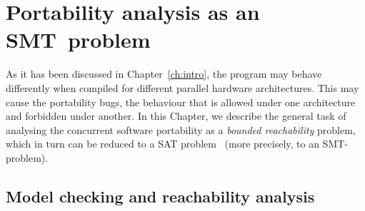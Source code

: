 \chapter{Portability analysis as an SMT~problem}%
\label{ch:port}







As it has been discussed in Chapter~\ref{ch:intro}, the program may behave differently when compiled for different parallel hardware architectures. This may cause the portability bugs, the behaviour that is allowed under one architecture and forbidden under another. 
In this Chapter, we describe the general task of analysing the concurrent software portability
as a \textit{bounded reachability} problem, which in turn can be reduced to a SAT problem~\cite{Porthos17a} (more precisely, to an SMT-problem).


\section{Model checking and reachability analysis}
\label{ch:port:mc}

